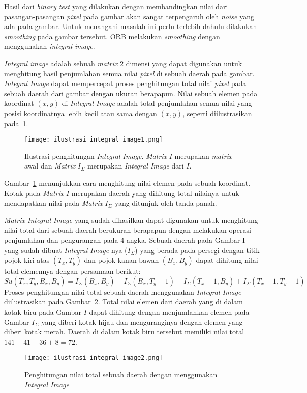 Hasil dari \textit{binary test} yang dilakukan dengan membandingkan nilai dari pasangan-pasangan \textit{pixel} pada gambar akan sangat terpengaruh oleh \textit{noise} yang ada pada gambar. Untuk menangani masalah ini perlu terlebih dahulu dilakukan \textit{smoothing} pada gambar tersebut. ORB melakukan \textit{smoothing} dengan menggunakan \textit{integral image}. 

\textit{Integral image} adalah sebuah \textit{matrix} 2 dimensi yang dapat digunakan untuk menghitung hasil penjumlahan semua nilai \textit{pixel} di sebuah daerah pada gambar. \textit{Integral Image} dapat mempercepat proses penghitungan total nilai \textit{pixel} pada sebuah daerah dari gambar dengan ukuran berapapun. Nilai sebuah elemen pada koordinat $(x,y)$ di \textit{Integral Image} adalah total penjumlahan semua nilai yang posisi koordinatnya lebih kecil atau sama dengan $(x,y)$, seperti diilustrasikan pada~\ref{fig:integral_image1}.
\begin{figure}[H]
	\centering
	\texttt{[image: ilustrasi\_integral\_image1.png]}
	\caption{Ilustrasi penghitungan \textit{Integral Image}. \textit{Matrix} $I$ merupakan \textit{matrix} awal dan \textit{Matrix} $I_\Sigma$ merupakan \textit{Integral Image} dari $I$.}
	\label{fig:integral_image1}
\end{figure}

Gambar~\ref{fig:integral_image1} menunjukkan cara menghitung nilai elemen pada sebuah koordinat. Kotak pada \textit{Matrix} $I$ merupakan daerah yang dihitung total nilainya untuk mendapatkan nilai pada \textit{Matrix} $I_\Sigma$ yang ditunjuk oleh tanda panah. 

\textit{Matrix Integral Image} yang sudah dihasilkan dapat digunakan untuk menghitung nilai total dari sebuah daerah berukuran berapapun dengan melakukan operasi penjumlahan dan pengurangan pada 4 angka. Sebuah daerah pada Gambar I yang sudah dibuat \textit{Integral Image}-nya ($I_\Sigma$) yang berada pada persegi dengan titik pojok kiri atas $(T_x, T_y)$ dan pojok kanan bawah $(B_x, B_y)$ dapat dihitung nilai total elemennya dengan persamaan berikut:
\begin{equation}
	Su(T_x, T_y, B_x, B_y) = I_\Sigma(B_x, B_y) - I_\Sigma(B_x, T_y-1) - I_\Sigma(T_x-1, B_y) + I_\Sigma(T_x-1,T_y-1)
\end{equation}
Proses penghitungan nilai total sebuah daerah menggunakan \textit{Integral Image} diilustrasikan pada Gambar~\ref{fig:integral_image2}. Total nilai elemen dari daerah yang di dalam kotak biru pada Gambar $I$ dapat dihitung dengan menjumlahkan elemen pada Gambar $I_\Sigma$ yang diberi kotak hijau dan menguranginya dengan elemen yang diberi kotak merah. Daerah di dalam kotak biru tersebut memiliki nilai total $141-41-36+8=72$.
\begin{figure}[H]
	\centering
	\texttt{[image: ilustrasi\_integral\_image2.png]}
	\caption{Penghitungan nilai total sebuah daerah dengan menggunakan \textit{Integral Image}}
	\label{fig:integral_image2}
\end{figure}

